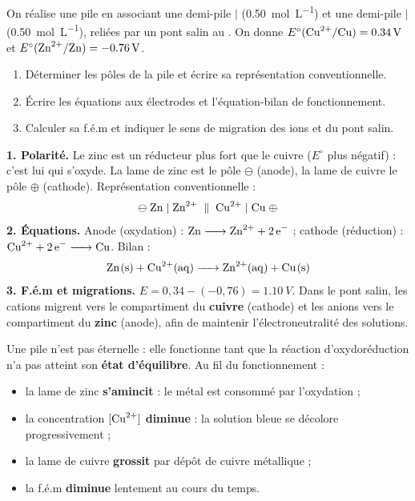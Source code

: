 \documentclass[11pt]{article}
\newcounter{popsec}
\newcounter{popsub}
\newcommand{\courssub}[1]{%
  \stepcounter{popsub}%
  \par\vspace{9pt}\noindent{\popxbold\fontsize{11.5}{13}\selectfont\color{popink}{\color{poporange}\thepopsec.\thepopsub}\hspace{6pt}#1}\par\nopagebreak\vspace{4pt}
}
\begin{document}
\begin{exoresolu}
On réalise une pile en associant une demi-pile  $\mid$  (\SI{0,50}{mol.L^{-1}}) et une demi-pile  $\mid$  (\SI{0,50}{mol.L^{-1}}), reliées par un pont salin au . On donne $E^\circ(\ce{Cu^2+}/\ce{Cu}) = \SI{+0,34}{V}$ et $E^\circ(\ce{Zn^2+}/\ce{Zn}) = \SI{-0,76}{V}$.
\begin{enumerate}
\item Déterminer les pôles de la pile et écrire sa représentation conventionnelle.
\item Écrire les équations aux électrodes et l'équation-bilan de fonctionnement.
\item Calculer sa f.é.m et indiquer le sens de migration des ions  et  du pont salin.
\end{enumerate}
\tcblower
\textbf{1. Polarité.} Le zinc est un réducteur plus fort que le cuivre ($E^\circ$ plus négatif) : c'est lui qui s'oxyde. La lame de zinc est le pôle $\ominus$ (anode), la lame de cuivre le pôle $\oplus$ (cathode). Représentation conventionnelle :
\[ \ominus \; \ce{Zn} \mid \ce{Zn^2+} \; \parallel \; \ce{Cu^2+} \mid \ce{Cu} \; \oplus \]
\textbf{2. Équations.} Anode (oxydation) : $\ce{Zn -> Zn^2+ + 2e-}$ ; cathode (réduction) : $\ce{Cu^2+ + 2e- -> Cu}$. Bilan :
\[ \ce{Zn(s) + Cu^2+(aq) -> Zn^2+(aq) + Cu(s)} \]
\textbf{3. F.é.m et migrations.} $E = 0,34 - (-0,76) = \SI{1,10}{V}$. Dans le pont salin, les cations  migrent vers le compartiment du \textbf{cuivre} (cathode) et les anions  vers le compartiment du \textbf{zinc} (anode), afin de maintenir l'électroneutralité des solutions.
\end{exoresolu}

\courssub{Usure et mort de la pile}

Une pile n'est pas éternelle : elle fonctionne tant que la réaction d'oxydoréduction n'a pas atteint son \textbf{état d'équilibre}. Au fil du fonctionnement :
\begin{itemize}
\item la lame de zinc \textbf{s'amincit} : le métal est consommé par l'oxydation ;
\item la concentration $[\ce{Cu^2+}]$ \textbf{diminue} : la solution bleue se décolore progressivement ;
\item la lame de cuivre \textbf{grossit} par dépôt de cuivre métallique ;
\item la f.é.m \textbf{diminue} lentement au cours du temps.
\end{itemize}
\end{document}
